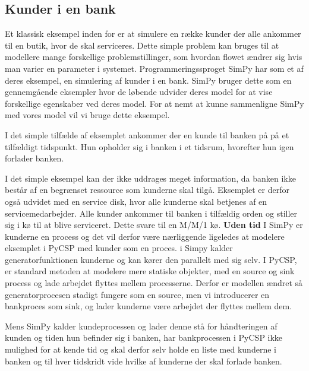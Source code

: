 \subsection{Kunder i en bank} Et klassisk eksempel inden for \des er at simulere  
en række kunder der alle ankommer til en butik, hvor de skal serviceres. Dette 
simple problem kan bruges til at modellere mange forskellige 
problemstillinger, som hvordan flowet ændrer sig hvis man varier en parameter 
i systemet. Programmeringssproget SimPy har som et af deres eksempel, en 
simulering af kunder i en bank. SimPy bruger dette som en gennemgående 
eksempler hvor de løbende udvider deres model for at vise forskellige 
egenskaber ved deres model. For at nemt at kunne sammenligne SimPy  med vores 
model vil vi bruge dette eksempel.

I det simple tilfælde af eksemplet ankommer der en kunde til banken på på et 
tilfældigt tidspunkt. Hun opholder sig i banken i et tidsrum, hvorefter hun 
igen forlader banken.

I det simple eksempel kan der ikke uddrages meget information, da banken ikke 
består af en begrænset ressource som kunderne skal tilgå.  Eksemplet er derfor 
også udvidet med en service disk, hvor alle kunderne skal betjenes af en 
servicemedarbejder. Alle kunder ankommer til banken i tilfældig orden og 
stiller sig i kø til at blive serviceret. Dette  svare til en M/M/1 kø.
\textbf{Uden tid}
I SimPy er kunderne en process og det vil derfor være nærliggende ligeledes at 
modelere eksemplet i PyCSP med kunder som en proces. i Simpy kalder 
generatorfunktionen kunderne og kan kører den parallelt med sig selv. 
I PyCSP, er standard metoden at modelere mere statiske objekter, med en source og sink 
process og lade arbejdet flyttes mellem processerne. Derfor er modellen ændret 
så  generatorprocesen stadigt fungere som en source, men vi introducerer en 
bankproces som sink, og lader kunderne være arbejdet der flyttes mellem dem. 

Mens SimPy  kalder kundeprocessen og lader denne stå for håndteringen af 
kunden og tiden hun befinder sig i banken, har bankprocessen i PyCSP ikke 
mulighed for at kende tid og skal derfor selv holde en liste med kunderne 
i banken og  til hver tidskridt vide hvilke af kunderne der skal forlade 
banken. 

